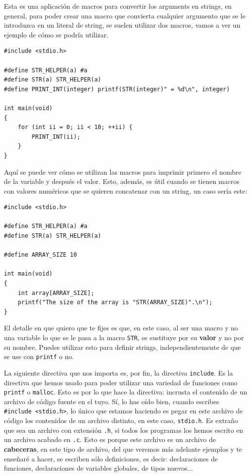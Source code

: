 \documentclass[a4paper]{article}
\begin{document}
Esta es una aplicación de macros para convertir los arguments en strings, en
general, para poder crear una macro que convierta cualquier argumento que se
le introduzca en un literal de string, se suelen utilizar dos macros, vamos a
ver un ejemplo de cómo se podría utilizar.

\noindent
\begin{minipage}[H]{\linewidth}
\mbox{}
\begin{lstlisting}[style=C,
caption={Macro para convertir a string},
label={lst:stringifyMacro}]
#include <stdio.h>

#define STR_HELPER(a) #a
#define STR(a) STR_HELPER(a)
#define PRINT_INT(integer) printf(STR(integer)" = %d\n", integer)

int main(void)
{
    for (int ii = 0; ii < 10; ++ii) {
        PRINT_INT(ii);
    }
}
\end{lstlisting}
\end{minipage}

Aquí se puede ver cómo se utilizan las macros para imprimir primero el nombre de
la variable y después el valor. Esto, además, es útil cuando se tienen macros
con valores numéricos que se quieren concatenar con un string, un caso sería
este:

\noindent
\begin{minipage}[H]{\linewidth}
\mbox{}
\begin{lstlisting}[style=C,
caption={Conversión de macros numéricas a string},
label={lst:stringifyMacroAndMacro}]
#include <stdio.h>

#define STR_HELPER(a) #a
#define STR(a) STR_HELPER(a)

#define ARRAY_SIZE 10

int main(void)
{
    int array[ARRAY_SIZE];
    printf("The size of the array is "STR(ARRAY_SIZE)".\n");
}
\end{lstlisting}
\end{minipage}

El detalle en que quiero que te fijes es que, en este caso, al ser una macro y
no una variable lo que se le pasa a la macro \verb!STR!, se sustituye por su
\textbf{valor} y no por su nombre. Puedes utilizar esto para definir strings,
independientemente de que se use con \verb!printf! o no.

La siguiente directiva que nos importa es, por fin, la directiva \verb!include!.
Es la directiva que hemos usado para poder utilizar una variedad de funciones
como \verb"printf" o \verb!malloc!. Esto es por lo que hace la directiva:
incrusta el contenido de un archivo de código fuente en el tuyo. Sí, lo has
oído bien, cuando escribes \verb!#include <stdio.h>!, lo único que estamos
haciendo es pegar en este archivo de código los contenidos de un archivo
distinto, en este caso, \verb!stdio.h!. Es extraño que sea un archivo con
extensión \verb!.h!, si todos los programas los hemos escrito en un archivo
acabado en \verb!.c!. Esto es porque este archivo es un archivo de
\textbf{cabeceras}, en este tipo de archivo, del que veremos más adelante
ejemplos y te enseñaré a hacer, se escriben sólo definiciones, es decir:
declaraciones de funciones, declaraciones de variables globales, de tipos
nuevos...
\end{document}
